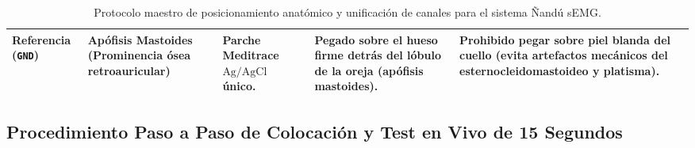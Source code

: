 \documentclass[11pt,a4paper]{article}
\begin{document}
\begin{table}[H]
\begin{tabularx}{\textwidth}{l l p{2.5cm} p{3.8cm} X}
\midrule
\textbf{Referencia} \newline (\texttt{GND}) & \textbf{Apófisis Mastoides} \newline (Prominencia ósea retroauricular) & Parche Meditrace $\text{Ag/AgCl}$ único. & Pegado sobre el hueso firme detrás del lóbulo de la oreja (apófisis mastoides). & Prohibido pegar sobre piel blanda del cuello (evita artefactos mecánicos del esternocleidomastoideo y platisma). \\
\bottomrule
\end{tabularx}
\caption{Protocolo maestro de posicionamiento anatómico y unificación de canales para el sistema Ñandú sEMG.}
\label{tab:protocolo_puntos_dulces}
\end{table}

\subsection{Procedimiento Paso a Paso de Colocación y Test en Vivo de 15 Segundos}
\end{document}
